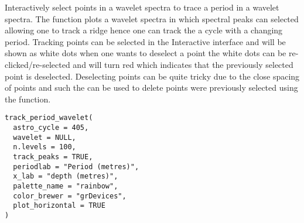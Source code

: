 \documentclass[a4paper]{book}
\begin{document}
\begin{Description}
Interactively select points in a wavelet spectra to trace a period in a wavelet spectra.
The  function plots a wavelet spectra in which spectral peaks can selected
allowing one to track a ridge hence one can track the a cycle with a changing period.
Tracking points can be selected in the Interactive interface and will be shown as white dots
when one wants to deselect a point the white dots can be re-clicked/re-selected and will turn red which
indicates that the previously selected point is deselected. Deselecting points can be quite tricky
due to the close spacing of  points and such the  can be used to
delete points were previously selected using the  function.
\end{Description}
%
\begin{Usage}
\begin{verbatim}
track_period_wavelet(
  astro_cycle = 405,
  wavelet = NULL,
  n.levels = 100,
  track_peaks = TRUE,
  periodlab = "Period (metres)",
  x_lab = "depth (metres)",
  palette_name = "rainbow",
  color_brewer = "grDevices",
  plot_horizontal = TRUE
)
\end{verbatim}
\end{Usage}
%
\end{document}
